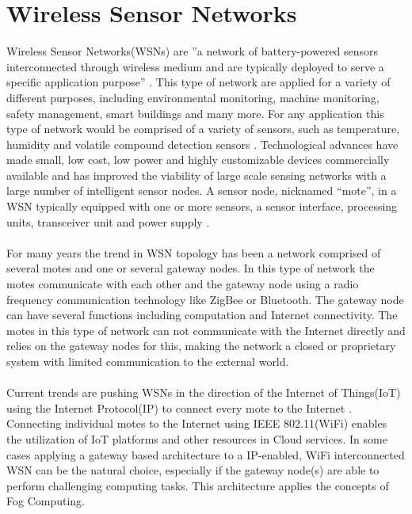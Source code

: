 \documentclass[]{uiophd}
\begin{document}
\section{Wireless Sensor Networks}
Wireless Sensor Networks(WSNs) are ''a network of battery-powered sensors interconnected through wireless medium and are typically deployed to serve a specific application purpose'' \cite{Ojha2015662}. This type of network are applied for a variety of different purposes, including environmental monitoring, machine monitoring, safety management, smart buildings and many more. For any application this type of network would be comprised of a variety of sensors, such as temperature, humidity and volatile compound detection sensors \cite{s90604728}. Technological advances have made small, low cost, low power and highly customizable devices commercially available and has improved the viability of large scale sensing networks with a large number of intelligent sensor nodes. A sensor node, nicknamed “mote”, in a WSN typically equipped with one or more sensors, a sensor interface, processing units, transceiver unit and power supply \cite{Gubbi20131645}.
\\\\
For many years the trend in WSN topology has been a network comprised of several motes and one or several gateway nodes. In this type of network the motes communicate with each other and the gateway node using a radio frequency communication technology like ZigBee or Bluetooth. The gateway node can have several functions including computation and Internet connectivity. The motes in this type of network can not communicate with the Internet directly and relies on the gateway nodes for this, making the network a closed or proprietary system with limited communication to the external world. 
\\\\
Current trends are pushing WSNs in the direction of the Internet of Things(IoT) using the Internet Protocol(IP) to connect every mote to the Internet \cite{6064380}. Connecting individual motes to the Internet using IEEE 802.11(WiFi) enables the utilization of IoT platforms and other resources in Cloud services. In some cases applying a gateway based architecture to a IP-enabled, WiFi interconnected WSN can be the natural choice, especially if the gateway node(s) are able to perform challenging computing tasks. This architecture applies the concepts of Fog Computing.
\\\\
\end{document}
